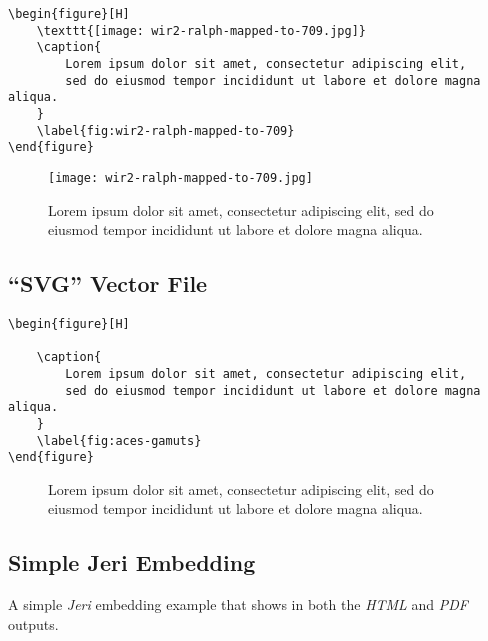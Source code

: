 \begin{lstlisting}[caption={Embedding a ``JPG'' raster file.}]
\begin{figure}[H]
    \texttt{[image: wir2-ralph-mapped-to-709.jpg]}
    \caption{
        Lorem ipsum dolor sit amet, consectetur adipiscing elit,
        sed do eiusmod tempor incididunt ut labore et dolore magna aliqua.
    }
    \label{fig:wir2-ralph-mapped-to-709}
\end{figure}
\end{lstlisting}

\begin{figure}[H]
    \texttt{[image: wir2-ralph-mapped-to-709.jpg]}
    \caption{
        Lorem ipsum dolor sit amet, consectetur adipiscing elit,
        sed do eiusmod tempor incididunt ut labore et dolore magna aliqua.
    }
    \label{fig:wir2-ralph-mapped-to-709}
\end{figure}

\subsection*{``SVG'' Vector File}
\label{subsec:svg-vector-file}

\begin{lstlisting}[caption={Embedding a ``SVG'' vector file.}]
\begin{figure}[H]
    
    \caption{
        Lorem ipsum dolor sit amet, consectetur adipiscing elit,
        sed do eiusmod tempor incididunt ut labore et dolore magna aliqua.
    }
    \label{fig:aces-gamuts}
\end{figure}
\end{lstlisting}

\begin{figure}[H]
    
    \caption{
        Lorem ipsum dolor sit amet, consectetur adipiscing elit,
        sed do eiusmod tempor incididunt ut labore et dolore magna aliqua.
    }
    \label{fig:aces-gamuts}
\end{figure}

\subsection*{Simple Jeri Embedding}

A simple \textit{Jeri} embedding example that shows in both the \textit{HTML}
and \textit{PDF} outputs.

